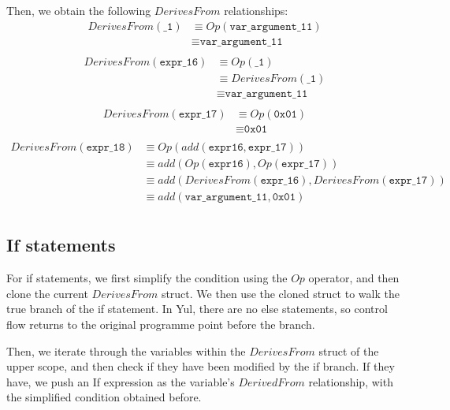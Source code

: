 Then, we obtain the following $DerivesFrom$ relationships:
\[
  \begin{aligned}
    DerivesFrom(\texttt{_1}) &\equiv Op(\texttt{var_argument_11}) \\
                             &\equiv \texttt{var_argument_11} \\
  \end{aligned}
\]
\[
  \begin{aligned}
    DerivesFrom(\texttt{expr_16}) &\equiv Op(\texttt{_1}) \\
                             &\equiv DerivesFrom(\texttt{_1}) \\
                             &\equiv \texttt{var_argument_11} \\
  \end{aligned}
\]
\[
  \begin{aligned}
    DerivesFrom(\texttt{expr_17}) &\equiv Op(\texttt{0x01}) \\
                             &\equiv \texttt{0x01} \\
  \end{aligned}
\]
\[
  \begin{aligned}
    DerivesFrom(\texttt{expr_18}) &\equiv Op(add(\texttt{expr16}, \texttt{expr_17})) \\
                             &\equiv add(Op(\texttt{expr16}), Op(\texttt{expr_17})) \\
                             &\equiv add(DerivesFrom(\texttt{expr_16}), DerivesFrom(\texttt{expr_17})) \\
                             &\equiv add(\texttt{var_argument_11}, \texttt{0x01}) \\
  \end{aligned}
\]

\subsection{If statements}

For if statements, we first simplify the condition using the $Op$ operator, and then clone the
current $DerivesFrom$ struct. We then use the cloned struct to walk the true branch of the if statement.
In Yul, there are no else statements, so control flow returns to the original programme point before the branch.

Then, we iterate through the variables within the $DerivesFrom$ struct of the upper scope, and then check if
they have been modified by the if branch. If they have, we push an If expression as the variable's $DerivedFrom$
relationship, with the simplified condition obtained before.

